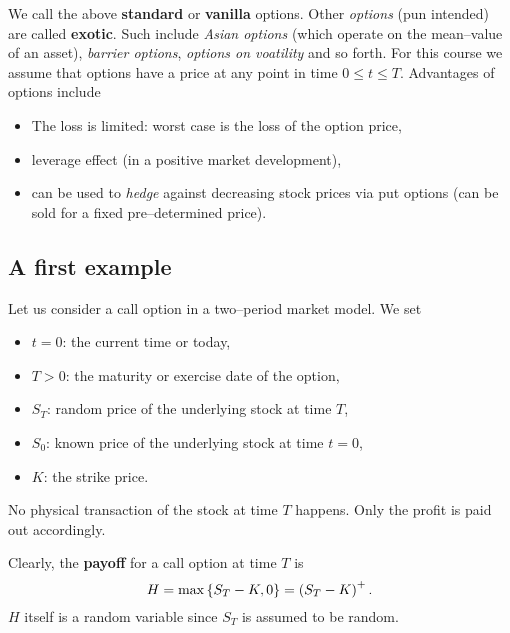\documentclass[12pt]{amsart}
\begin{document}
We call the above \textbf{standard} or \textbf{vanilla} options. Other \emph{options} (pun intended) are called \textbf{exotic}. Such include \emph{Asian options} (which operate on the mean--value of an asset), \emph{barrier options}, \emph{options on voatility} and so forth. For this course we assume that options have a price at any point in time \(0 \leq t \leq T\). Advantages of options include
\begin{itemize}
    \item The loss is limited: worst case is the loss of the option price,
    \item leverage effect (in a positive market development),
    \item can be used to \emph{hedge} against decreasing stock prices via put options (can be sold for a fixed pre--determined price).
\end{itemize}

\subsection{A first example}

Let us consider a call option in a two--period market model. We set
\begin{itemize}
    \item \(t=0\): the current time or today,
    \item \(T>0\): the maturity or exercise date of the option,
    \item \(S_T\): random price of the underlying stock at time \(T\),
    \item \(S_0\): known price of the underlying stock at time \(t=0\),
    \item \(K\): the strike price.
\end{itemize}

\begin{remark}
    No physical transaction of the stock at time \(T\) happens. Only the profit is paid out accordingly.
\end{remark}
Clearly, the \textbf{payoff} for a call option at time \(T\) is \[
    H = \max \left\{ S_T-K, 0 \right\} = \left(S_T-K\right)^+.
\]
\(H\) itself is a random variable since \(S_T\) is assumed to be random.
\end{document}
